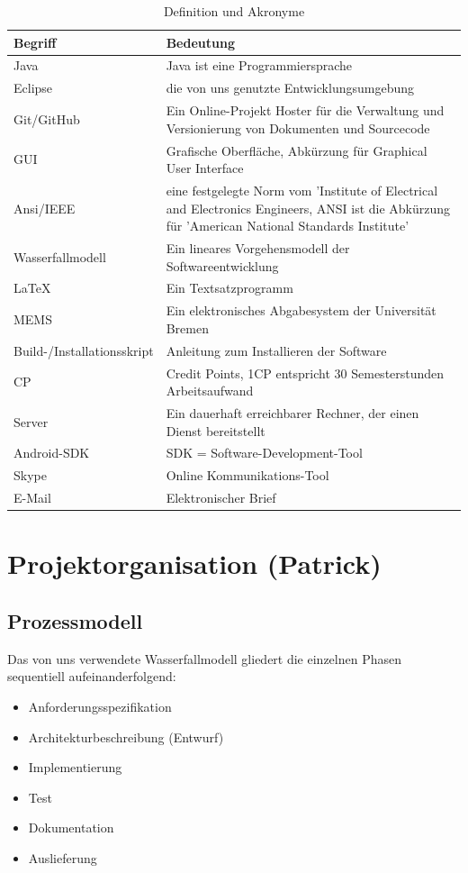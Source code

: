 \documentclass[fontsize=12pt,paper=a4,twoside]{scrartcl}
\begin{document}
\begin{table}[htbp]
\caption{Definition und Akronyme}
\centering
\begin{tabular}{p{7cm}|p{7cm}}
\hline Begriff & Bedeutung\\ \hline
\hline Java & Java ist eine Programmiersprache\\
\hline Eclipse & die von uns genutzte Entwicklungsumgebung\\
\hline Git/GitHub & Ein Online-Projekt Hoster für die Verwaltung und Versionierung von Dokumenten und Sourcecode\\
\hline GUI & Grafische Oberfläche, Abkürzung für Graphical User Interface\\
\hline Ansi/IEEE & eine festgelegte Norm vom 'Institute of Electrical and Electronics Engineers, ANSI ist die Abkürzung für 'American National Standards Institute'\\
\hline Wasserfallmodell & Ein lineares Vorgehensmodell der Softwareentwicklung\\
\hline \LaTeX & Ein Textsatzprogramm\\
\hline MEMS & Ein elektronisches Abgabesystem der Universität Bremen\\
\hline Build-/Installationsskript & Anleitung zum Installieren der Software\\
\hline CP & Credit Points, 1CP entspricht 30 Semesterstunden Arbeitsaufwand\\
\hline Server & Ein dauerhaft erreichbarer Rechner, der einen Dienst bereitstellt\\
\hline Android-SDK & SDK = Software-Development-Tool\\
\hline Skype & Online Kommunikations-Tool\\
\hline E-Mail & Elektronischer Brief\\
\hline 
\hline
\end{tabular}
\end{table}

\newpage

\section{Projektorganisation (Patrick)}

\subsection{Prozessmodell}

Das von uns verwendete Wasserfallmodell gliedert die einzelnen Phasen sequentiell aufeinanderfolgend:\\
\begin{itemize}

\item Anforderungsspezifikation
\item Architekturbeschreibung (Entwurf)
\item Implementierung
\item Test
\item Dokumentation
\item Auslieferung
\end{itemize}
\end{document}
